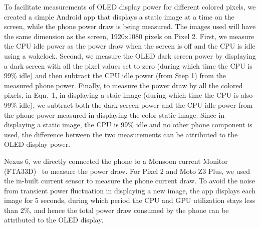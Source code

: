 To facilitate measurements of OLED display power for different colored
pixels, we created a simple Android app that displays a static image
at a time on the screen, while the phone power draw is being measured.
The images used will have the same dimension as the screen, \eg
1920x1080 pixels on Pixel 2.
First, we measure the CPU idle power 
as the power draw when the screen is off and the CPU is idle using a wakelock.
Second, we measure the OLED dark screen power 
by displaying a dark screen with all the pixel values set to zero
(during which time the CPU is 99\% idle)
and then subtract the CPU idle power (from Step 1) from the measured phone power.
Finally, to measure the power draw by all the colored pixels,
 in Eqn.~1,
in displaying a staic image (during which time the CPU is also 99\% idle),
 we subtract both the dark
screen power and the CPU idle power
from the phone power measured in displaying the color static image.
Since in displaying a static image, the CPU
is 99\% idle and no other phone component is used, the difference
between the two measurements can be attributed to the OLED display power.
\fi



Nexus 6, we directly connected the phone to a Monsoon current
Monitor (FTA33D)~\cite{monsoon} to measure the power draw.  For Pixel
2 and Moto Z3 Plus, we used the in-built current sensor to measure the
phone current draw.  To avoid the noise from transient power
fluctuation in displaying a new image, the app displays each image for
5 seconds, during which period the CPU and GPU utilization stays less
than 2\%, and hence the
total power draw consumed by the phone can be attributed to the OLED
display.
\fi

